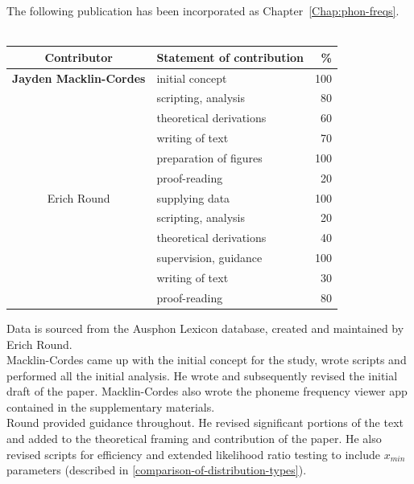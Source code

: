 \cleartoevenpage
\pagestyle{empty}	

\noindent
The following publication has been incorporated as Chapter~\ref{Chap:phon-freqs}.\\

\noindent
{}\\

\begin{table}[h]
	\centering
	\begin{tabular}{clr}
		\toprule
		Contributor & Statement of contribution & \% \\
		\midrule
		\textbf{Jayden Macklin-Cordes}	& initial concept			& 100 \\
		                                & scripting, analysis     	& 80  \\
		                                & theoretical derivations 	& 60  \\
		                                & writing of text 			& 70  \\
		                                & preparation of figures 	& 100 \\
										& proof-reading				& 20  \\
		\midrule
		Erich Round						& supplying data            & 100 \\
		                                & scripting, analysis       & 20  \\
		                                & theoretical derivations 	& 40  \\
		                                & supervision, guidance 	& 100 \\
		                                & writing of text 			& 30  \\
										& proof-reading				& 80  \\
		\bottomrule
	\end{tabular}
\end{table}

\noindent
Data is sourced from the Ausphon Lexicon database, created and maintained by Erich Round.\\
\noindent
Macklin-Cordes came up with the initial concept for the study, wrote scripts and performed all the initial analysis. He wrote and subsequently revised the initial draft of the paper. Macklin-Cordes also wrote the phoneme frequency viewer app contained in the supplementary materials.\\
\noindent
Round provided guidance throughout. He revised significant portions of the text and added to the theoretical framing and contribution of the paper. He also revised scripts for efficiency and extended likelihood ratio testing to include $x_{min}$ parameters (described in \ref{comparison-of-distribution-types}).


